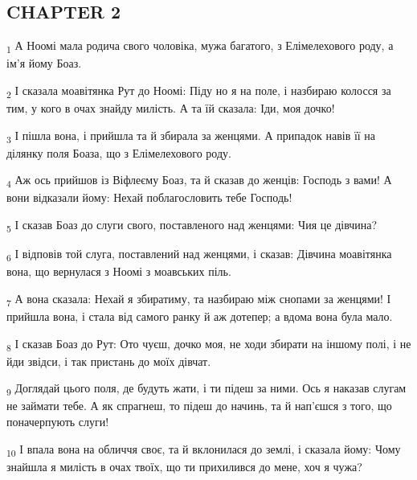 \subsection{CHAPTER 2}
\begin{tcolorbox}
\textsubscript{1} А Ноомі мала родича свого чоловіка, мужа багатого, з Елімелехового роду, а ім'я йому Боаз.
\end{tcolorbox}
\begin{tcolorbox}
\textsubscript{2} І сказала моавітянка Рут до Ноомі: Піду но я на поле, і назбираю колосся за тим, у кого в очах знайду милість. А та їй сказала: Іди, моя дочко!
\end{tcolorbox}
\begin{tcolorbox}
\textsubscript{3} І пішла вона, і прийшла та й збирала за женцями. А припадок навів її на ділянку поля Боаза, що з Елімелехового роду.
\end{tcolorbox}
\begin{tcolorbox}
\textsubscript{4} Аж ось прийшов із Віфлеєму Боаз, та й сказав до женців: Господь з вами! А вони відказали йому: Нехай поблагословить тебе Господь!
\end{tcolorbox}
\begin{tcolorbox}
\textsubscript{5} І сказав Боаз до слуги свого, поставленого над женцями: Чия це дівчина?
\end{tcolorbox}
\begin{tcolorbox}
\textsubscript{6} І відповів той слуга, поставлений над женцями, і сказав: Дівчина моавітянка вона, що вернулася з Ноомі з моавських піль.
\end{tcolorbox}
\begin{tcolorbox}
\textsubscript{7} А вона сказала: Нехай я збиратиму, та назбираю між снопами за женцями! І прийшла вона, і стала від самого ранку й аж дотепер; а вдома вона була мало.
\end{tcolorbox}
\begin{tcolorbox}
\textsubscript{8} І сказав Боаз до Рут: Ото чуєш, дочко моя, не ходи збирати на іншому полі, і не йди звідси, і так пристань до моїх дівчат.
\end{tcolorbox}
\begin{tcolorbox}
\textsubscript{9} Доглядай цього поля, де будуть жати, і ти підеш за ними. Ось я наказав слугам не займати тебе. А як спрагнеш, то підеш до начинь, та й нап'єшся з того, що поначерпують слуги!
\end{tcolorbox}
\begin{tcolorbox}
\textsubscript{10} І впала вона на обличчя своє, та й вклонилася до землі, і сказала йому: Чому знайшла я милість в очах твоїх, що ти прихилився до мене, хоч я чужа?
\end{tcolorbox}

